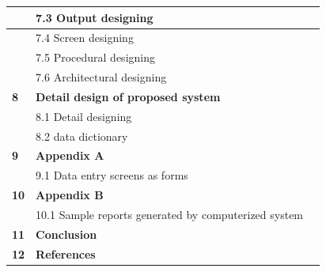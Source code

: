 \documentclass{article} %
\begin{document}
\begin{tabular}{|p{0.8in}|p{3.0in}|p{0.8in}|}
\textbf{} & 7.3 Output designing & \textbf{} \\ \hline 
\textbf{} & 7.4 Screen designing & \textbf{} \\ \hline 
\textbf{} & 7.5 Procedural designing & \textbf{} \\ \hline 
\textbf{} & 7.6 Architectural designing & \textbf{} \\ \hline 
\textbf{8} & \textbf{Detail design of proposed system} & \textbf{} \\ \hline 
\textbf{} & 8.1 Detail designing & \textbf{} \\ \hline 
\textbf{} & 8.2 data dictionary & \textbf{} \\ \hline 
\textbf{9} & \textbf{Appendix A} & \textbf{} \\ \hline 
\textbf{} & 9.1 Data entry screens as forms & \textbf{} \\ \hline 
\textbf{10} & \textbf{Appendix B} & \textbf{} \\ \hline 
\textbf{} & 10.1 Sample reports generated by computerized system & \textbf{} \\ \hline 
\textbf{11} & \textbf{Conclusion} & \textbf{} \\ \hline 
\textbf{12} & \textbf{References} & \textbf{} \\ \hline 
\end{tabular}

\textbf{\underbar{}}

\noindent \textbf{}

\noindent \textbf{}

\noindent \textbf{}

\noindent \textbf{}

\noindent \textbf{}

\noindent \textbf{}

\noindent \textbf{}

\noindent \textbf{}

\noindent \textbf{}

\noindent \textbf{}

\noindent \textbf{}

\noindent \textbf{}

\noindent \textbf{}

\noindent \textbf{}

\noindent \textbf{}

\noindent \textbf{}

\noindent \textbf{}

\noindent \textbf{}

\noindent \textbf{}
\end{document}

